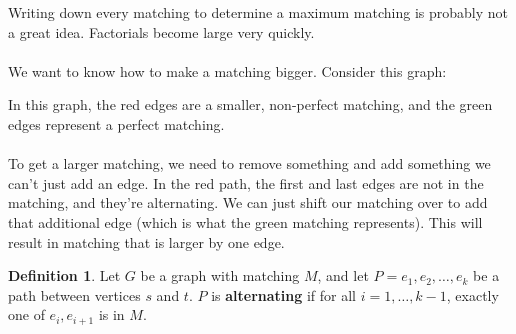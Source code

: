 \documentclass[]{article}
\theoremstyle{definition}
\newtheorem*{defn}{Definition}
\begin{document}
				Writing down every matching to determine a maximum matching is probably not a great idea. Factorials become large very quickly.
				\\ \\
				We want to know how to make a matching bigger. Consider this graph:
				\begin{center}
				\end{center}
				
				In this graph, the red edges are a smaller, non-perfect matching, and the green edges represent a perfect matching.
				\\ \\
				To get a larger matching, we need to remove something and add something \textendash{} we can't just add an edge. In the red path, the first and last edges are not in the matching, and they're alternating. We can just shift our matching over to add that additional edge (which is what the green matching represents). This will result in matching that is larger by one edge.
				
				\begin{defn}
					Let $G$ be a graph with matching $M$, and let $P = e_1, e_2, \ldots, e_k$ be a path between vertices $s$ and $t$. $P$ is \textbf{alternating} if for all $i = 1, \ldots, k - 1$, exactly one of $e_i, e_{i + 1}$ is in $M$.
				\end{defn}
				
\end{document}
